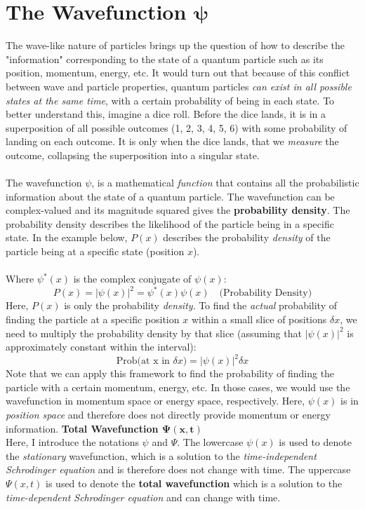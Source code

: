 \documentclass[12pt]{article}
\begin{document}
\section*{The Wavefunction $\mathbf{\psi}$}
The wave-like nature of particles brings up the question of how to describe the "information" corresponding to the state of a quantum particle such as its position, momentum, energy, etc. It would turn out that because of this conflict between wave and particle properties, quantum particles \textit{can exist in all possible states at the same time}, with a certain probability of being in each state. To better understand this, imagine a dice roll. Before the dice lands, it is in a superposition of all possible outcomes (1, 2, 3, 4, 5, 6) with some probability of landing on each outcome. It is only when the dice lands, that we \textit{measure} the outcome, collapsing the superposition into a singular state.\\\\
The wavefunction $\psi$, is a mathematical \textit{function} that contains all the probabilistic information about the state of a quantum particle. The wavefunction can be complex-valued and its magnitude squared gives the \textbf{probability density}. The probability density describes the likelihood of the particle being in a specific state. In the example below, $P(x)$ describes the probability \textit{density} of the particle being at a specific state (position $x$).\\\\
Where $\psi^*(x)$ is the complex conjugate of $\psi(x)$:
\[\boxed{P(x) = |\psi(x)|^2=\psi^*(x)\psi(x)\quad\text{(Probability Density)}}\]
Here, $P(x)$ is only the probability \textit{density}. To find the \textit{actual} probability of finding the particle at a specific position $x$ within a small slice of positions $\delta x$, we need to multiply the probability density by that slice (assuming that $|\psi(x)|^2$ is approximately constant within the interval):
\[\boxed{\text{Prob(at x in $\delta x$)} = |\psi(x)|^2 \delta x}\]
Note that we can apply this framework to find the probability of finding the particle with a certain momentum, energy, etc. In those cases, we would use the wavefunction in momentum space or energy space, respectively. Here, $\psi(x)$ is in \textit{position space} and therefore does not directly provide momentum or energy information.\newpage\noindent
\textbf{Total Wavefunction $\mathbf{\Psi(x,t)}$}\\
Here, I introduce the notations $\psi$ and $\Psi$. The lowercase $\psi(x)$ is used to denote the \textit{stationary} wavefunction, which is a solution to the \textit{time-independent Schrodinger equation} and is therefore does not change with time. The uppercase $\Psi(x,t)$ is used to denote the \textbf{total wavefunction} which is a solution to the \textit{time-dependent Schrodinger equation} and can change with time.\\\\
\end{document}
